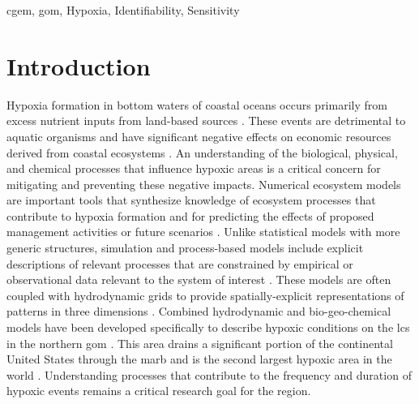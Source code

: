\documentclass[review]{elsarticle}\usepackage[]{graphicx}\usepackage[]{color}
\begin{document}
\begin{frontmatter}
\begin{keyword}
\ac{cgem}, \ac{gom}, Hypoxia, Identifiability, Sensitivity
\end{keyword}

\end{frontmatter}

\acresetall

\section{Introduction}

Hypoxia formation in bottom waters of coastal oceans occurs primarily from excess nutrient inputs from land-based sources \citep{Justic87,Diaz95,Howarth96}.  These events are detrimental to aquatic organisms and have significant negative effects on economic resources derived from coastal ecosystems \citep{Lipton03,Diaz11}.  An understanding of the biological, physical, and chemical processes that influence hypoxic areas is a critical concern for mitigating and preventing these negative impacts.  Numerical ecosystem models are important tools that synthesize knowledge of ecosystem processes that contribute to hypoxia formation and for predicting the effects of proposed management activities or future scenarios \citep{Scavia04,Hagy07,Camacho14a,Pauer16}.  Unlike statistical models with more generic structures, simulation and process-based models include explicit descriptions of relevant processes that are constrained by empirical or observational data relevant to the system of interest \citep[e.g.][]{Omlin01b,Eldridge10}.  These models are often coupled with hydrodynamic grids to provide spatially-explicit representations of patterns in three dimensions \citep{Warner05,Dortch07,Zhao10,Ganju16}. Combined hydrodynamic and bio-geo-chemical models have been developed specifically to describe hypoxic conditions on the \ac{lcs} in the northern \ac{gom} \citep{Fennel13,Obenour15,Pauer16,Lehrter17}.  This area drains a significant portion of the continental United States through the \ac{marb} and is the second largest hypoxic area in the world \citep{Rabalais02}.  Understanding processes that contribute to the frequency and duration of hypoxic events remains a critical research goal for the region.  
\end{document}
